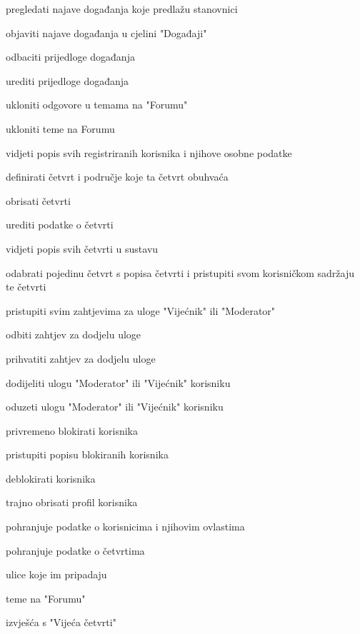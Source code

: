 \begin{packed_enum}
				\item  {}
				\begin{packed_enum}
					\item pregledati najave događanja koje predlažu stanovnici
					\item objaviti najave događanja u cjelini "Događaji"
					\item odbaciti prijedloge događanja
					\item urediti prijedloge događanja
					\item ukloniti odgovore u temama na "Forumu"
					\item ukloniti teme na Forumu
				\end{packed_enum}
				
				\item  {}
				\begin{packed_enum}
					\item vidjeti popis svih registriranih korisnika i njihove osobne podatke
					\item definirati četvrt i područje koje ta četvrt obuhvaća
					\item obrisati četvrti
					\item urediti podatke o četvrti
					\item vidjeti popis svih četvrti u sustavu
					\item odabrati pojedinu četvrt s popisa četvrti i pristupiti svom korisničkom sadržaju te četvrti
					\item pristupiti svim zahtjevima za uloge "Vijećnik" ili "Moderator"
					\item odbiti zahtjev za dodjelu uloge
					\item prihvatiti zahtjev za dodjelu uloge
					\item dodijeliti ulogu "Moderator" ili "Vijećnik" korisniku
					\item oduzeti ulogu "Moderator" ili "Vijećnik" korisniku
					\item privremeno blokirati korisnika
					\item pristupiti popisu blokiranih korisnika
					\item deblokirati korisnika
					\item trajno obrisati profil korisnika
				\end{packed_enum}
				
				\item  {}
				\begin{packed_enum}
					\item pohranjuje podatke o korisnicima i njihovim ovlastima
					\item pohranjuje podatke o četvrtima
					\begin{packed_enum}
						\item ulice koje im pripadaju
						\item teme na "Forumu"
						\item izvješća s "Vijeća četvrti"
					\end{packed_enum}
				\end{packed_enum}
				
			\end{packed_enum}
			
